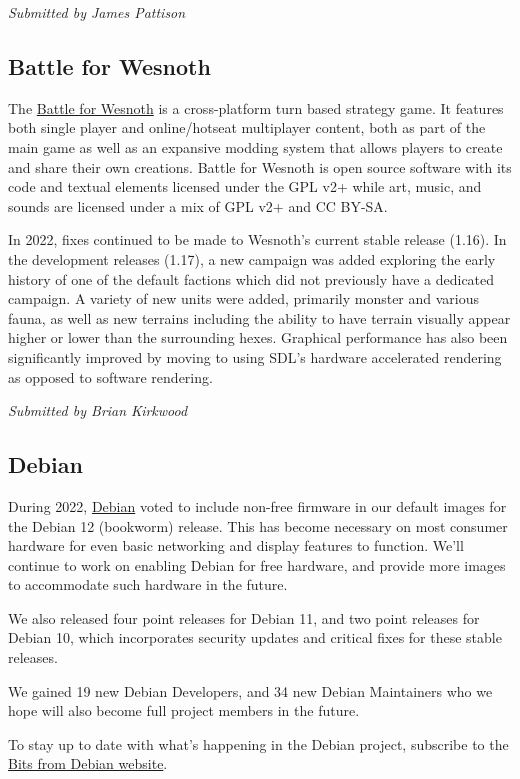 \documentclass[a4paper]{report}
\begin{document}
{\em Submitted by James Pattison}

\subsection{Battle for Wesnoth}

The \href{https://www.wesnoth.org/}{Battle for Wesnoth} is a cross-platform turn based strategy game. It features both single player and online/hotseat multiplayer content, both as part of the main game as well as an expansive modding system that allows players to create and share their own creations. Battle for Wesnoth is open source software with its code and textual elements licensed under the GPL v2+ while art, music, and sounds are licensed under a mix of GPL v2+ and CC BY-SA.

In 2022, fixes continued to be made to Wesnoth's current stable release (1.16). In the development releases (1.17), a new campaign was added exploring the early history of one of the default factions which did not previously have a dedicated campaign. A variety of new units were added, primarily monster and various fauna, as well as new terrains including the ability to have terrain visually appear higher or lower than the surrounding hexes. Graphical performance has also been significantly improved by moving to using SDL's hardware accelerated rendering as opposed to software rendering.

{\em Submitted by Brian Kirkwood}

\subsection{Debian}

During 2022, \href{https://www.debian.org/}{Debian} voted to include non-free firmware in our default images for the Debian 12 (bookworm) release.  This has become necessary on most consumer hardware for even basic networking and display features to function. We'll continue to work on enabling Debian for free hardware, and provide more images to accommodate such hardware in the future.

We also released four point releases for Debian 11, and two point releases for Debian 10, which incorporates security updates and critical fixes for these stable releases.

We gained 19 new Debian Developers, and 34 new Debian Maintainers who we hope will also become full project members in the future.

To stay up to date with what's happening in the Debian project, subscribe to the \href{http://bits.debian.org/}{Bits from Debian website}.
\end{document}
